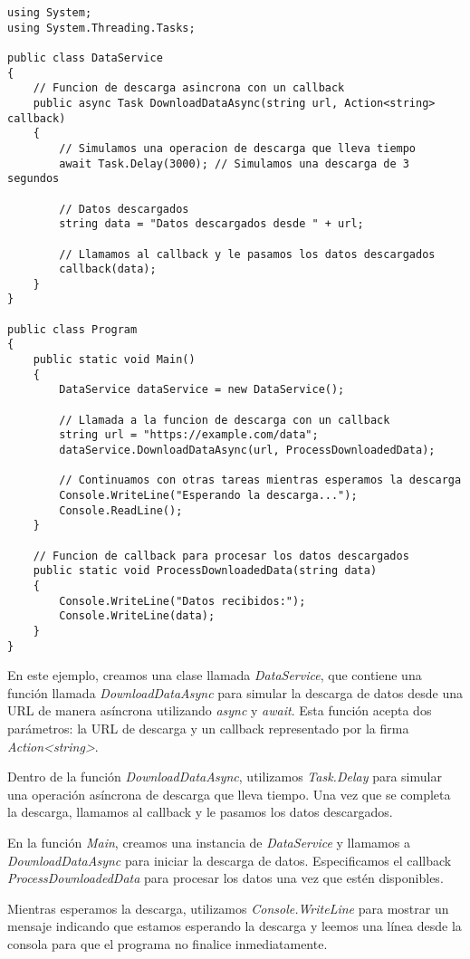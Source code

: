 \documentclass[executivepaper]{article}
\begin{document}
\begin{lstlisting}
using System;
using System.Threading.Tasks;

public class DataService
{
    // Funcion de descarga asincrona con un callback
    public async Task DownloadDataAsync(string url, Action<string> callback)
    {
        // Simulamos una operacion de descarga que lleva tiempo
        await Task.Delay(3000); // Simulamos una descarga de 3 segundos

        // Datos descargados
        string data = "Datos descargados desde " + url;

        // Llamamos al callback y le pasamos los datos descargados
        callback(data);
    }
}

public class Program
{
    public static void Main()
    {
        DataService dataService = new DataService();

        // Llamada a la funcion de descarga con un callback
        string url = "https://example.com/data";
        dataService.DownloadDataAsync(url, ProcessDownloadedData);

        // Continuamos con otras tareas mientras esperamos la descarga
        Console.WriteLine("Esperando la descarga...");
        Console.ReadLine();
    }

    // Funcion de callback para procesar los datos descargados
    public static void ProcessDownloadedData(string data)
    {
        Console.WriteLine("Datos recibidos:");
        Console.WriteLine(data);
    }
}
\end{lstlisting}

En este ejemplo, creamos una clase llamada \emph{DataService}, que contiene una función llamada \emph{DownloadDataAsync} para simular la descarga de datos desde una URL de manera asíncrona utilizando \emph{async} y \emph{await}. Esta función acepta dos parámetros: la URL de descarga y un callback representado por la firma \emph{Action<string>}.

Dentro de la función \emph{DownloadDataAsync}, utilizamos \emph{Task.Delay} para simular una operación asíncrona de descarga que lleva tiempo. Una vez que se completa la descarga, llamamos al callback y le pasamos los datos descargados.

En la función \emph{Main}, creamos una instancia de \emph{DataService} y llamamos a \emph{DownloadDataAsync} para iniciar la descarga de datos. Especificamos el callback \emph{ProcessDownloadedData} para procesar los datos una vez que estén disponibles.

Mientras esperamos la descarga, utilizamos \emph{Console.WriteLine} para mostrar un mensaje indicando que estamos esperando la descarga y leemos una línea desde la consola para que el programa no finalice inmediatamente.
\end{document}
